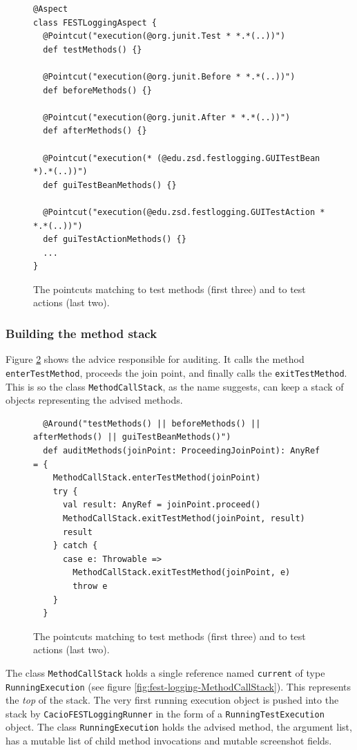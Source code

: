 \begin{figure}[h!]
\centering
\begin{lstlisting}
@Aspect
class FESTLoggingAspect {
  @Pointcut("execution(@org.junit.Test * *.*(..))")
  def testMethods() {}

  @Pointcut("execution(@org.junit.Before * *.*(..))")
  def beforeMethods() {}

  @Pointcut("execution(@org.junit.After * *.*(..))")
  def afterMethods() {}

  @Pointcut("execution(* (@edu.zsd.festlogging.GUITestBean *).*(..))")
  def guiTestBeanMethods() {}

  @Pointcut("execution(@edu.zsd.festlogging.GUITestAction * *.*(..))")
  def guiTestActionMethods() {}
  ...
}
\end{lstlisting}
\caption{The pointcuts matching to test methods (first three) and to test actions (last two).}
\label{fig:fest-logging-pointcuts}
\end{figure}

\subsubsection{Building the method stack}

Figure \ref{fig:fest-logging-auditMethods} shows the advice responsible for auditing. It calls the method \texttt{enterTestMethod}, proceeds the join point, and finally calls the \texttt{exitTestMethod}. This is so the class \texttt{MethodCallStack}, as the name suggests, can keep a stack of objects representing the advised methods.

\begin{figure}[h!]
\centering
\begin{lstlisting}
  @Around("testMethods() || beforeMethods() || afterMethods() || guiTestBeanMethods()")
  def auditMethods(joinPoint: ProceedingJoinPoint): AnyRef = {
    MethodCallStack.enterTestMethod(joinPoint)
    try {
      val result: AnyRef = joinPoint.proceed()
      MethodCallStack.exitTestMethod(joinPoint, result)
      result
    } catch {
      case e: Throwable =>
        MethodCallStack.exitTestMethod(joinPoint, e)
        throw e
    }
  }
\end{lstlisting}
\caption{The pointcuts matching to test methods (first three) and to test actions (last two).}
\label{fig:fest-logging-auditMethods}
\end{figure}

The class \texttt{MethodCallStack} holds a single reference named \texttt{current} of type \texttt{RunningExecution} (see figure \ref{fig:fest-logging-MethodCallStack}). This represents the \emph{top} of the stack. The very first running execution object is pushed into the stack by \texttt{CacioFESTLoggingRunner} in the form of a \texttt{RunningTestExecution} object. The class \texttt{RunningExecution} holds the advised method, the argument list, has a mutable list of child method invocations and mutable screenshot fields. 

